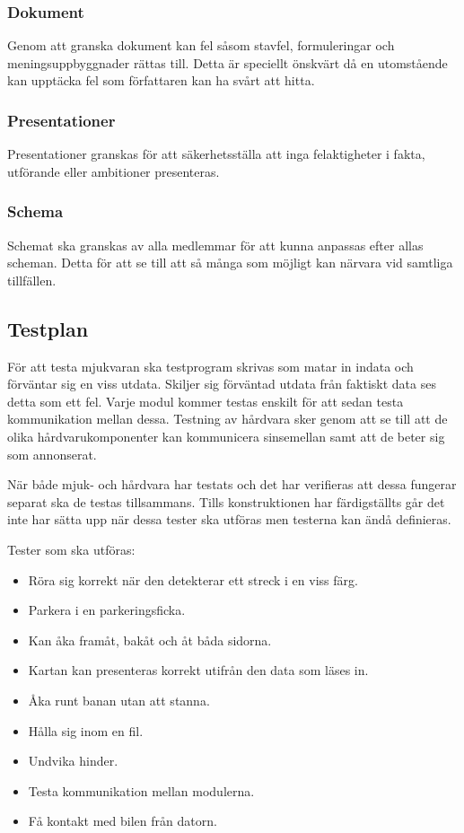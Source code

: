 \documentclass[projektplan/plan.tex]{subfiles}
\begin{document}
\subsubsection{Dokument}	
Genom att granska dokument kan fel såsom stavfel, formuleringar och
meningsuppbyggnader rättas till. Detta är speciellt önskvärt då en utomstående
kan upptäcka fel som författaren kan ha svårt att hitta.

\subsubsection{Presentationer}	
Presentationer granskas för att säkerhetsställa att inga felaktigheter i fakta,
utförande eller ambitioner presenteras.

\subsubsection{Schema}	
Schemat ska granskas av alla medlemmar för att kunna anpassas efter allas
scheman. Detta för att se till att så många som möjligt kan närvara vid
samtliga tillfällen. 

\subsection{Testplan}
För att testa mjukvaran ska testprogram skrivas som matar in indata och
förväntar sig en viss utdata. Skiljer sig förväntad utdata från faktiskt data
ses detta som ett fel. Varje modul kommer testas enskilt för att sedan testa
kommunikation mellan dessa. Testning av hårdvara sker genom att se till att de
olika hårdvarukomponenter kan kommunicera sinsemellan samt att de beter sig som
annonserat.

När både mjuk- och hårdvara har testats och det har verifieras att dessa
fungerar separat ska de testas tillsammans. Tills konstruktionen har
färdigställts går det inte har sätta upp när dessa tester ska utföras men
testerna kan ändå definieras.

\vspace{5mm}
\noindent
Tester som ska utföras:
\begin{itemize}
    \item Röra sig korrekt när den detekterar ett streck i en viss färg.
    \item Parkera i en parkeringsficka.
    \item Kan åka framåt, bakåt och åt båda sidorna.
    \item Kartan kan presenteras korrekt utifrån den data som läses in.
    \item Åka runt banan utan att stanna.
    \item Hålla sig inom en fil.
    \item Undvika hinder.
    \item Testa kommunikation mellan modulerna.
    \item Få kontakt med bilen från datorn.
\end{itemize}
\end{document}
